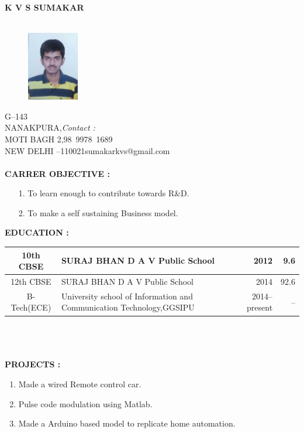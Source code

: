\documentclass{article}
\begin{document}
	\begin{center}
		\textbf{K V S SUMAKAR}\\
		\hrulefill\\
		
	\end{center}
	\begin{figure}[h]
		\centering
	\includegraphics[width=0.2\textwidth]{IMG-20160524-WA0002}
	
	\end{figure}
	G--143\\ 
	NANAKPURA,\hfill \textsl{Contact :}\\
	MOTI BAGH 2,\hfill \mbox{98 9978 1689}\\
	NEW DELHI --\mbox{110021}\hfill \mbox{sumakarkvs@gmail.com}\\
	\\
	\leavevmode
	\textbf{CARRER OBJECTIVE :}
	\begin{itemize}
\item[1.] 	To learn enough to contribute towards R\&D.
\item[2.]	To make a self sustaining Business model.\\
	\end{itemize}
	
\leavevmode
	\textbf{EDUCATION :\\}

	\begin{tabular}{|c|p{60 mm}|r|r|}
 \hline
		 10th CBSE  &                    SURAJ BHAN D A V Public School                    &            2012 &             9.6 \\ \hline
		 12th CBSE  &                    SURAJ BHAN D A V Public School                    &            2014 &            92.6 \\ \hline
		B-Tech(ECE) & University school of Information and Communication Technology,GGSIPU &   2014--present &              -- \\ \hline
	\end{tabular}
	\\
	\\
\leavevmode
\\
	\textbf{PROJECTS :}
	\begin{enumerate}
		\item Made a wired Remote control car.
		\item Pulse code modulation using Matlab.
		\item Made a Arduino based model to replicate home automation.
	\end{enumerate}
\end{document}
